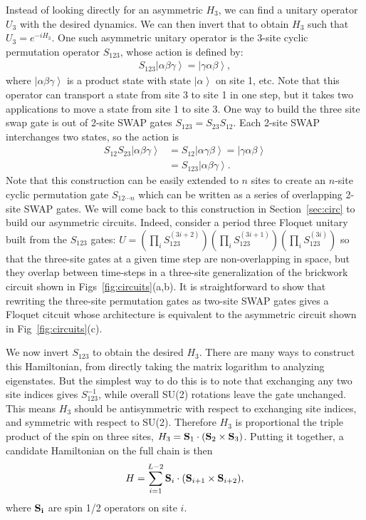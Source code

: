\documentclass[aps,prx,reprint,superscriptaddress, longbibliography]{revtex4-1}
\renewcommand{\ket}[1]{\left|#1\right\rangle}
\begin{document}
Instead of looking directly for an asymmetric $H_3$, we can find a unitary operator $U_3$ with the desired dynamics. We can then invert that to obtain $H_3$ such that $U_3=e^{-iH_3}$. One such asymmetric unitary operator is the 3-site cyclic permutation operator $S_{123}$, whose action is defined by:
\begin{align}
S_{123}\ket{\alpha\beta\gamma} =\ket{\gamma\alpha\beta}, \label{eqn:condition}
\end{align}
where $\ket{\alpha\beta\gamma}$ is a product state with state $\ket{\alpha}$ on site 1, etc. Note that this operator can transport a state from site 3 to site 1 in one step, but it takes two applications to move a state from site 1 to site 3. One way to build the three site swap gate is out of 2-site SWAP gates $S_{123} = S_{23}S_{12}$. Each 2-site SWAP interchanges two states, so the action is 
\begin{align}
S_{12}S_{23}\ket{\alpha\beta\gamma} &= S_{12}\ket{\alpha\gamma\beta} = 
\ket{\gamma\alpha\beta}\nonumber\\
&= S_{123}\ket{\alpha\beta\gamma}.
\end{align}
Note that this construction can be easily extended to $n$ sites to create an $n$-site cyclic permutation gate $S_{12\cdots n}$ which can be written as a series of overlapping 2-site SWAP gates. We will come back to this construction in Section~\ref{sec:circ} to build our asymmetric circuits. Indeed, consider a period three Floquet unitary built from the $S_{123}$ gates:
$U = \left(\prod_i S_{123}^{(3i+2)}\right) \left(\prod_i S_{123}^{(3i+1)}\right) \left(\prod_i S_{123}^{(3i)}\right) $
so that the three-site gates at a given time step are non-overlapping in space, but they overlap between time-steps in a three-site generalization of the brickwork circuit shown in Figs~\ref{fig:circuits}(a,b). It is straightforward to show that rewriting the three-site permutation gates as two-site SWAP gates gives a Floquet citcuit whose architecture is equivalent to the asymmetric circuit shown in Fig~\ref{fig:circuits}(c).   

We now invert $S_{123}$ to obtain the desired $H_3$. There are many ways to construct this Hamiltonian, from directly taking the matrix logarithm to analyzing eigenstates. But the simplest way to do this is to note that exchanging any two site indices gives $S_{123}^{-1}$, while overall SU(2) rotations leave the gate unchanged. This means $H_3$ should be antisymmetric with respect to exchanging site indices, and symmetric with respect to SU(2). Therefore $H_3$ is proportional the triple product of the spin on three sites, $H_3 = {\bf S}_1\cdot({\bf S}_{2}\times {\bf S}_{3})$. Putting it together, a candidate Hamiltonian on the full chain is then
\begin{align}
H = \sum_{i=1}^{L-2}{\bf S}_i\cdot({\bf S}_{i+1}\times {\bf S}_{i+2}),
\label{eq:Hamtriple}
\end{align}
where $\bf{S}_i$ are spin 1/2 operators on site $i$. 
\end{document}
